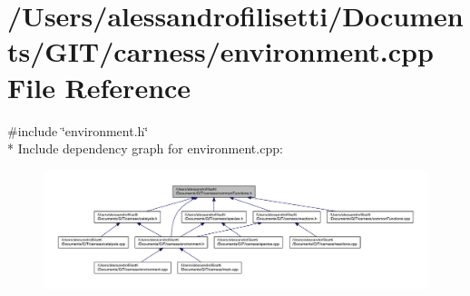 \hypertarget{a00061}{\section{/\-Users/alessandrofilisetti/\-Documents/\-G\-I\-T/carness/environment.cpp File Reference}
\label{a00061}
}
{\ttfamily \#include \char`\"{}environment.\-h\char`\"{}}\\*
Include dependency graph for environment.\-cpp\-:
\nopagebreak
\begin{figure}[H]
\begin{center}
\leavevmode
\includegraphics[width=350pt]{a00177}
\end{center}
\end{figure}
